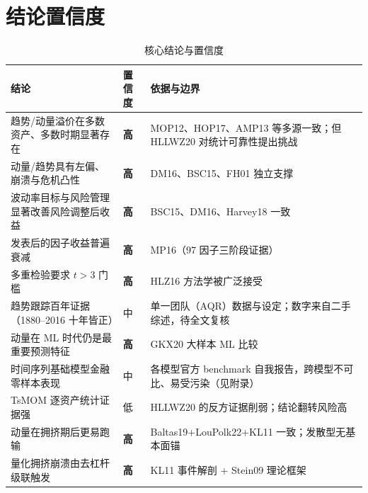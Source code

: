 \documentclass[11pt,a4paper]{article}
\newcommand{\confhigh}{\textbf{高}}
\newcommand{\confmid}{中}
\newcommand{\conflow}{低}
\begin{document}
\section{结论置信度}
\begin{table}[htbp]
\centering\footnotesize
\caption{核心结论与置信度}\label{tab:conf}
\begin{tabular}{@{}p{7.2cm}p{1.2cm}p{5.2cm}@{}}
\toprule
\textbf{结论} & \textbf{置信度} & \textbf{依据与边界} \\
\midrule
趋势/动量溢价在多数资产、多数时期显著存在 & \confhigh & MOP12、HOP17、AMP13 等多源一致；但 HLLWZ20 对统计可靠性提出挑战 \\
动量/趋势具有左偏、崩溃与危机凸性 & \confhigh & DM16、BSC15、FH01 独立支撑 \\
波动率目标与风险管理显著改善风险调整后收益 & \confhigh & BSC15、DM16、Harvey18 一致 \\
发表后的因子收益普遍衰减 & \confhigh & MP16（97 因子三阶段证据） \\
多重检验要求 $t>3$ 门槛 & \confhigh & HLZ16 方法学被广泛接受 \\
趋势跟踪百年证据（1880--2016 十年皆正） & \confmid & 单一团队（AQR）数据与设定；数字来自二手综述，待全文复核 \\
动量在 ML 时代仍是最重要预测特征 & \confhigh & GKX20 大样本 ML 比较 \\
时间序列基础模型金融零样本表现 & \confmid & 各模型官方 benchmark 自我报告，跨模型不可比、易受污染（见附录） \\
TsMOM 逐资产统计证据强 & \conflow & HLLWZ20 的反方证据削弱；结论翻转风险高 \\
动量在拥挤期后更易跑输 & \confhigh & Baltas19+LouPolk22+KL11 一致；发散型无基本面锚 \\
量化拥挤崩溃由去杠杆级联触发 & \confhigh & KL11 事件解剖 + Stein09 理论框架 \\
\bottomrule
\end{tabular}
\end{table}
\end{document}
